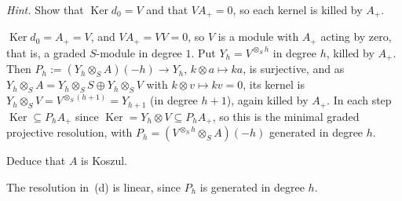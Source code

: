 \documentclass[11pt,a4paper]{exam}
\DeclareMathOperator{\Ker}{Ker}
\begin{document}
\begin{questions}
\begin{parts}
\begin{subparts}
\emph{Hint.} Show that $\Ker d_0=V$ and that $VA_+=0$, so each kernel is killed by $A_+$.
\begin{solution}
$\Ker d_0=A_+=V$, and $VA_+=VV=0$, so $V$ is a module with $A_+$ acting by zero, that is, a graded $S$-module in degree $1$.
Put $Y_h=V^{\otimes_Sh}$ in degree $h$, killed by $A_+$.
Then $P_h:=(Y_h\otimes_SA)(-h)\to Y_h$, $k\otimes a\mapsto ka$, is surjective, and as $Y_h\otimes_SA=Y_h\otimes_SS\oplus Y_h\otimes_SV$ with $k\otimes v\mapsto kv=0$, its kernel is $Y_h\otimes_SV=V^{\otimes_S(h+1)}=Y_{h+1}$ (in degree $h+1$), again killed by $A_+$.
In each step $\Ker\subseteq P_hA_+$ since $\Ker=Y_h\otimes V\subseteq P_hA_+$, so this is the minimal graded projective resolution, with $P_h=(V^{\otimes_Sh}\otimes_SA)(-h)$ generated in degree $h$.
\end{solution}
\subpart Deduce that $A$ is Koszul.
\begin{solution}
The resolution in~(d) is linear, since $P_h$ is generated in degree $h$.
\end{solution}
\end{subparts}


\end{parts}
\end{questions}
\end{document}
